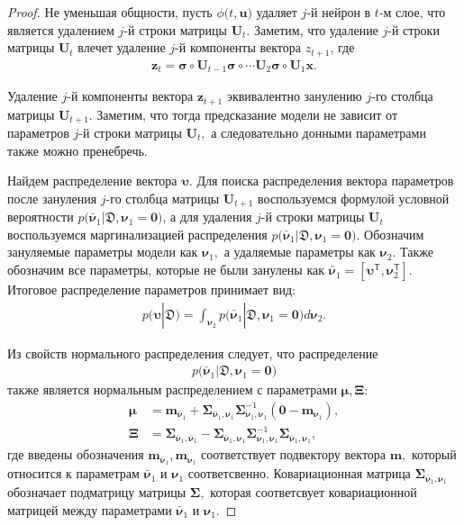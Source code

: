 \begin{proof}
Не уменьшая общности, пусть $\phi\bigr(t, \mathbf{u}\bigr)$ удаляет $j$-й нейрон в $t$-м слое, что является удалением $j$-й строки матрицы $\mathbf{U}_t$. Заметим, что удаление $j$-й строки матрицы $\mathbf{U}_t$ влечет удаление $j$-й компоненты вектора $z_{t+1}$, где
\[
\label{eq:ap:tr:neural:1}
\begin{aligned}
\mathbf{z}_{t} = \bm{\sigma} \circ \mathbf{U}_{t-1} \bm{\sigma} \circ \cdots  \mathbf{U}_2\bm{\sigma} \circ \mathbf{U}_1\mathbf{x}.
\end{aligned}
\]

Удаление $j$-й компоненты вектора $\mathbf{z}_{t+1}$ эквивалентно занулению $j$-го столбца матрицы $\mathbf{U}_{t+1}.$ Заметим, что тогда предсказание модели не зависит от параметров $j$-й строки матрицы $\mathbf{U}_t,$ а следовательно донными параметрами также можно пренебречь.

Найдем распределение вектора $\bm{\upsilon}.$ Для поиска распределения вектора параметров после зануления $j$-го столбца матрицы $\mathbf{U}_{t+1}$ воспользуемся формулой условной вероятности $p\bigr(\bar{\bm{\nu}}_1|\mathfrak{D}, \bm{\nu}_1=\mathbf{0}\bigr)$, а для удаления $j$-й строки матрицы $\mathbf{U}_{t}$ воспользуемся маргинализацией распределения $p\bigr(\bar{\bm{\nu}}_1|\mathfrak{D}, \bm{\nu}_1=\mathbf{0}\bigr)$. Обозначим зануляемые параметры модели как $\bm{\nu}_1,$ а удаляемые параметры как $\bm{\nu}_2.$ Также обозначим все параметры, которые не были занулены как $\bar{\bm{\nu}}_1 = [\bm{\upsilon}^{\mathsf{T}}, \bm{\nu}_2^{\mathsf{T}}].$ Итоговое распределение параметров принимает  вид:
\[
\label{eq:ap:tr:1:1}
\begin{aligned}
p\bigr(\bm{\upsilon}|\mathfrak{D}\bigr)  = \int_{\bm{\nu}_2}p\bigr(\bar{\bm{\nu}}_1|\mathfrak{D}, \bm{\nu}_1=\mathbf{0}\bigr) d\bm{\nu}_2.
\end{aligned}
\]

Из свойств нормального распределения следует, что распределение
\[
\label{eq:ap:tr:neural:2}
\begin{aligned}
p\bigr(\bar{\bm{\nu}}_1|\mathfrak{D}, \bm{\nu}_1=\mathbf{0}\bigr)
\end{aligned}
\]
также является нормальным распределением с параметрами $\bm{\mu}, \bm{\Xi}$:
\[
\label{eq:ap:tr:1:1}
\begin{aligned}
\bm{\mu} &= \mathbf{m}_{\bar{\bm{\nu}}_1}+\bm{\Sigma}_{\bar{\bm{\nu}}_1,\bm{\nu}_1} \bm{\Sigma}_{\bm{\nu}_1,\bm{\nu}_1}^{-1} \left(\mathbf{0} - \mathbf{m}_{\bm{\nu}_1}\right), \\
 \bm{\Xi} &= \bm{\Sigma}_{\bar{\bm{\nu}}_1,\bar{\bm{\nu}}_1} - \bm{\Sigma}_{\bar{\bm{\nu}}_1,\bm{\nu}_1} \bm{\Sigma}_{\bm{\nu}_1,\bm{\nu}_1}^{-1} \bm{\Sigma}_{\bar{\bm{\nu}}_1,\bm{\nu}_1},
\end{aligned}
\]
где введены обозначения $\mathbf{m}_{\bar{\bm{\nu}}_1}, \mathbf{m}_{\bm{\nu}_1}$ соответствует подвектору вектора $\mathbf{m},$ который относится к параметрам $\bar{\bm{\nu}}_1$ и $\bm{\nu}_1$ соответсвенно. Ковариационная матрица $\bm{\Sigma}_{\bar{\bm{\nu}}_1,\bm{\nu}_1}$ обозначает подматрицу матрицы $\bm{\Sigma},$ которая соответсвует ковариационной матрицей между параметрами $\bar{\bm{\nu}}_1$ и $\bm{\nu}_1.$


\end{proof}
